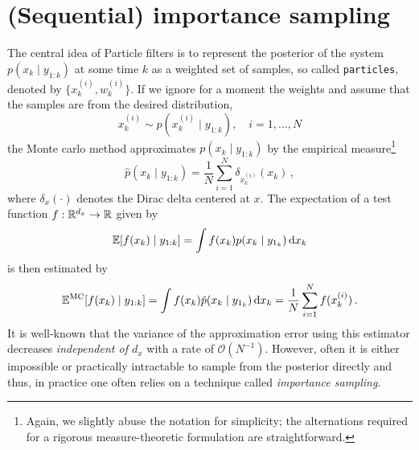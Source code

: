 \section*{(Sequential) importance sampling}
The central idea of Particle filters is to represent the posterior of
the system $p(x_k \mid y_{1:k})$ at some time $k$ as a weighted set of
samples, so called \texttt{particles}, denoted by
$\{ x^{(i)}_k, w^{(i)}_k \}.$ If we ignore for a moment the weights
and assume that the samples are from the desired distribution, \ie
\[
  x^{(i)}_k \sim p(x_k^{(i)} \mid y_{1:k}), \quad i = 1, \dotsc, N
\]
the Monte carlo method approximates $p(x_k \mid y_{1:k})$ by the
empirical measure\footnote{Again, we slightly abuse the notation for
  simplicity; the alternations required for a rigorous
  measure-theoretic formulation are straightforward.}
\begin{equation}
  \label{eq:empirical_measure}
  \hat{p}(x_k \mid y_{1:k}) = \frac{1}{N} \sum_{i = 1}^N
  \delta_{x_k^{(i)}}(x_k)\,,
\end{equation}
where $\delta_x(\cdot)$ denotes the Dirac delta centered at $x$. The
expectation of a test function $f : \mathbb{R}^{d_x} \rightarrow \mathbb{R}$ given by
\[
  \mathbb{E}[f(x_k) \mid y_{1:k}] = \int f(x_k) p(x_k \mid y_{1_k})
  \,\mathrm{d}x_k
\]
is then estimated by
\[
  {\mathbb{E}}^{\text{MC}}[f(x_k) \mid y_{1:k}] = \int f(x_k)
  \hat{p}(x_k \mid y_{1_k}) \,\mathrm{d}x_k = \frac{1}{N} \sum_{i=1}^N
  f(x^{(i)}_k)\,.
\]
It is well-known that the variance of the approximation error using
this estimator decreases \emph{independent of $d_x$} with a rate of
$\mathcal{O}(N^{-1})$. However, often it is either impossible or
practically intractable to sample from the posterior directly and
thus, in practice one often relies on a technique called
\emph{importance sampling}.

